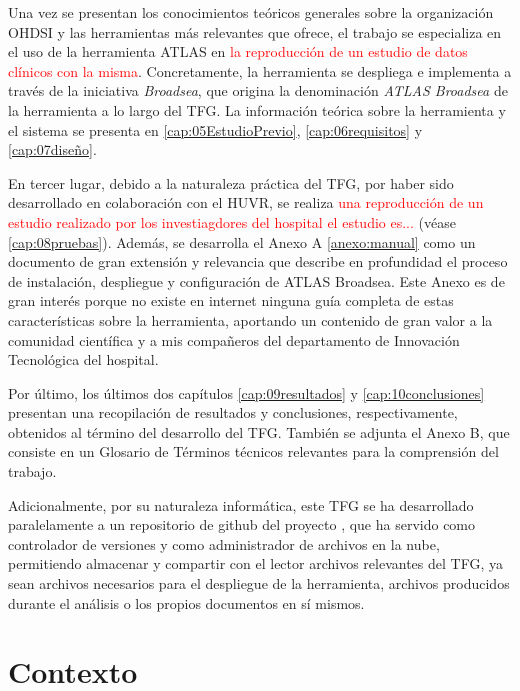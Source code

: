 Una vez se presentan los conocimientos teóricos generales sobre la organización OHDSI y las herramientas más relevantes que ofrece, el trabajo se especializa en el uso de la herramienta ATLAS en \textcolor{red}{la reproducción de un estudio de datos clínicos con la misma}. Concretamente, la herramienta se despliega e implementa a través de la iniciativa \textit{Broadsea}, que origina la denominación \textit{ATLAS Broadsea} de la herramienta a lo largo del TFG. La información teórica sobre la herramienta y el sistema se presenta en \ref{cap:05EstudioPrevio}, \ref{cap:06requisitos} y \ref{cap:07diseño}.

En tercer lugar, debido a la naturaleza práctica del TFG, por haber sido desarrollado en colaboración con el HUVR, se realiza \textcolor{red}{una reproducción de un estudio realizado por los investiagdores del hospital el estudio es...} (véase \ref{cap:08pruebas}). Además, se desarrolla el Anexo A \ref{anexo:manual} como un documento de gran extensión y relevancia que describe en profundidad el proceso de instalación, despliegue y configuración de ATLAS Broadsea. Este Anexo es de gran interés porque no existe en internet ninguna guía completa de estas características sobre la herramienta, aportando un contenido de gran valor a la comunidad científica y a mis compañeros del departamento de Innovación Tecnológica del hospital.

Por último, los últimos dos capítulos \ref{cap:09resultados} y \ref{cap:10conclusiones} presentan una recopilación de resultados y conclusiones, respectivamente, obtenidos al término del desarrollo del TFG. También se adjunta el Anexo B, que consiste en un Glosario de Términos técnicos relevantes para la comprensión del trabajo. 

Adicionalmente, por su naturaleza informática, este TFG se ha desarrollado paralelamente a un repositorio de github del proyecto \cite{vallealonsodc}, que ha servido como controlador de versiones y como administrador de archivos en la nube, permitiendo almacenar y compartir con el lector archivos relevantes del TFG, ya sean archivos necesarios para el despliegue de la herramienta, archivos producidos durante el análisis o los propios documentos en sí mismos.

\section{Contexto} \label{sec:01Contexto} 

